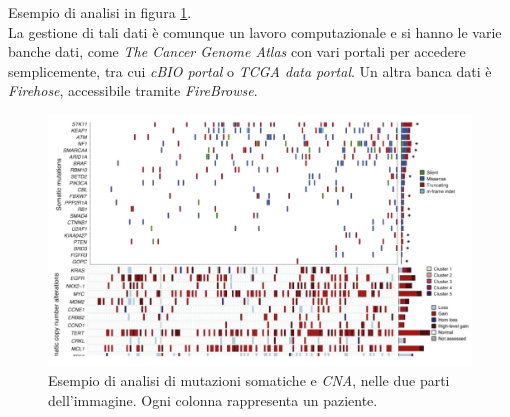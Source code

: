 \documentclass[a4paper,12pt, oneside]{book}
\begin{document}
Esempio di analisi in figura \ref{fig:csd}.\\
La gestione di tali dati è comunque un lavoro computazionale e
si hanno le varie banche dati, come \textit{The Cancer Genome Atlas} con vari
portali per accedere semplicemente, tra cui \textit{cBIO portal} o \textit{TCGA
  data portal}. Un altra banca dati è \textit{Firehose}, accessibile tramite
\textit{FireBrowse}. 
\begin{figure}
  \centering
  \includegraphics[scale = 0.25]{img/csd.jpg}
  \caption{Esempio di analisi di mutazioni somatiche e \textit{CNA}, nelle due
    parti dell'immagine. Ogni colonna rappresenta un paziente. } 
  \label{fig:csd}
\end{figure}
\end{document}
